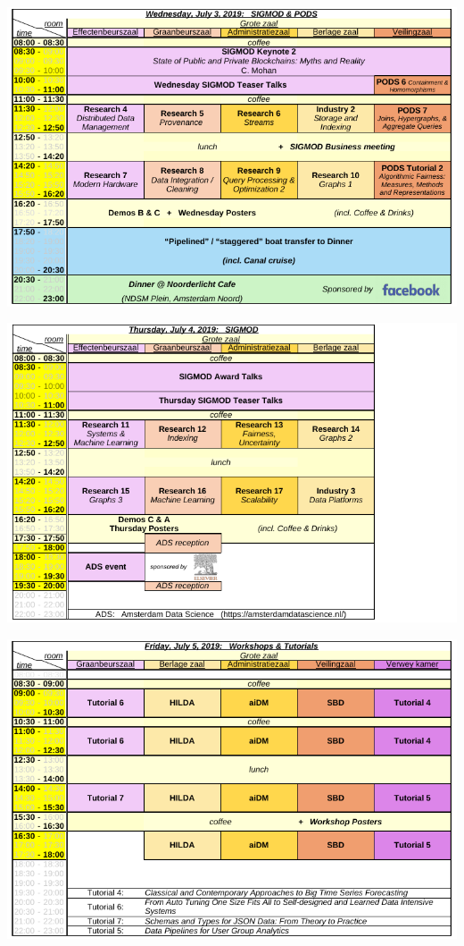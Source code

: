 \includegraphics[angle=90,width=\textwidth]{schedule/p4.pdf}%

\includegraphics[angle=90,width=\textwidth]{schedule/p5.pdf}%

\includegraphics[angle=90,width=\textwidth]{schedule/p6.pdf}%
